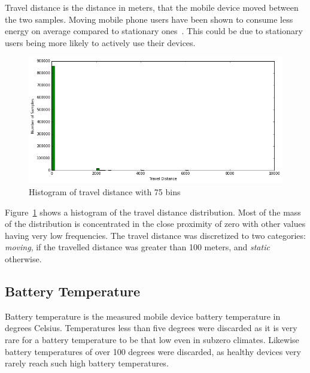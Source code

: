 Travel distance is the distance in meters, that the mobile device moved between the two samples. Moving mobile phone users have been shown to consume less energy on average compared to stationary ones~\cite{7146507}. This could be due to stationary users being more likely to actively use their devices. 

\begin{figure} %
	\centering
	\includegraphics[width=\textwidth]{images/carat-data/travel_distance.png}
	\caption{Histogram of travel distance with 75 bins}
	\label{figure:carat-data-travel-distance}
\end{figure}  

Figure~\ref{figure:carat-data-travel-distance} shows a histogram of the travel distance distribution. Most of the mass of the distribution is concentrated in the close proximity of zero with other values having very low frequencies. The travel distance was discretized to two categories: \textit{moving}, if the travelled distance was greater than 100 meters, and \textit{static} otherwise.

\subsection{Battery Temperature}  

Battery temperature is the measured mobile device battery temperature in degrees Celsius. Temperatures less than five degrees were discarded as it is very rare for a battery temperature to be that low even in subzero climates. Likewise battery temperatures of over 100 degrees were discarded, as healthy devices very rarely reach such high battery temperatures.

